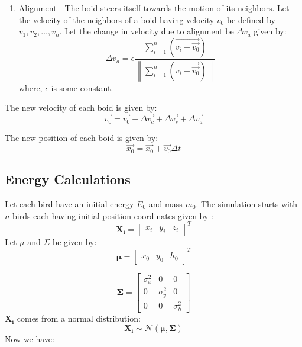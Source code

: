 \documentclass[a4paper]{article}
\newcommand\norm[1]{\left\lVert#1\right\rVert}
\begin{document}
\begin{enumerate}

\item\underline{Alignment} - The boid steers itself towards the motion of its neighbors. Let the velocity of the neighbors of a boid having velocity $v_{0}$ be defined by $v_{1}, v_{2}, \ldots, v_{n}$. Let the change in velocity due to alignment be $\Delta v_{a}$ given by:
\[ \Delta v_{a} = \epsilon \frac{\sum_{i=1}^{n}(\vec{v_{i} - \vec{v_{0}}})}{\norm{\sum_{i=1}^{n}(\vec{v_{i} - \vec{v_{0}}})}} \]
where, $\epsilon$ is some constant.


\end{enumerate}

The new velocity of each boid is given by:
\[ \vec{v_{0}} = \vec{v_{0}} + \Delta \vec{v_{c}} + \Delta \vec{v_{s}}+ \Delta \vec{v_{a}} \]

The new position of each boid is given by:
\[ \vec{x_{0}} = \vec{x_{0}} + \vec{v_{0}}\Delta t  \]

\subsection{Energy Calculations}

Let each bird have an initial energy $E_{0}$ and mass $m_{0}$.
The simulation starts with $n$ birds each having initial position coordinates  given by :
\[ \boldsymbol{X_{i}} =  \begin{bmatrix} x_{i} & y_{i} & z_{i} \end{bmatrix} ^{T} \]
Let $\mu$ and $\Sigma$ be given by:
\[ \boldsymbol\mu =  \begin{bmatrix} x_{0} & y_{0} & h_{0} \end{bmatrix} ^{T} \]

\[ \boldsymbol\Sigma =  \begin{bmatrix} 
\sigma_{x}^{2} & 0 & 0 \\
0 & \sigma_{y}^{2} & 0 \\
0 & 0 & \sigma_{h}^{2}
 \end{bmatrix} \]
$\boldsymbol{X_{i}}$ comes from a normal distribution:
\[ \boldsymbol{X_{i}} \sim \mathcal{N} (\boldsymbol\mu, \boldsymbol\Sigma) \]
Now we have:
\end{document}

